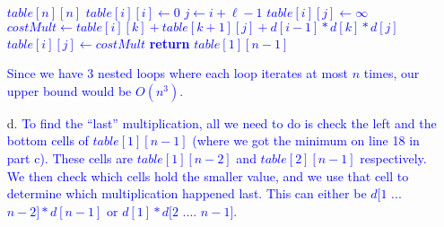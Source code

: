 \documentclass[11pt]{article}
\begin{document}
\begin{itemize}
\textcolor{blue}{
\begin{algorithmic}[1]
	\State $table[n][n]$
		\State $table[i][i] \gets 0$
	\EndFor
			\State $j \gets i + \ell - 1$
			\State $table[i][j] \gets \infty$
				\State $costMult \gets table[i][k] + table[k+1][j] + d[i-1] * d[k] * d[j]$
					\State $table[i][j] \gets costMult$
				\EndIf
			\EndFor
		\EndFor
	\EndFor
	\State \textbf{return} $table[1][n-1]$
\EndFunction
\end{algorithmic}
}
\textcolor{blue}{
	Since we have 3 nested loops where each loop iterates at most $n$ times, our upper bound would be $\boxed{O(n^3)}$.
}
\item[d.]
\textcolor{blue}{
	To find the ``last'' multiplication, all we need to do is check the left and the bottom cells of $table[1][n-1]$ (where we got the minimum on line 18 in part c). These cells are $table[1][n-2]$ and $table[2][n-1]$ respectively. We then check which cells hold the smaller value, and we use that cell to determine which multiplication happened last. This can either be $d[1$ ... $n-2] * d[n-1]$ or $d[1] * d[2$ .... $n-1]$.
}

\end{itemize}
\end{document}
